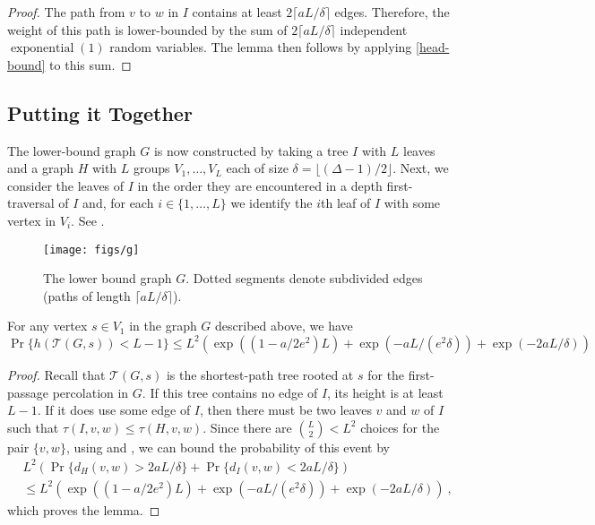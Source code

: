 \documentclass{patmorin}
\DeclareMathOperator{\exponential}{exponential}
\newcommand{\tcal}{\mathcal{T}}
\begin{document}
\begin{proof}
  The path from $v$ to $w$ in $I$ contains at least $2\lceil
  aL/\delta\rceil$ edges.  Therefore, the weight of this path is
  lower-bounded by the sum of $2\lceil aL/\delta\rceil$ independent
  $\exponential(1)$ random variables.  The lemma then follows by applying
  \eqref{head-bound} to this sum.
\end{proof}


\subsection{Putting it Together}

The lower-bound graph $G$ is now constructed by taking a tree $I$ with
$L$ leaves and a graph $H$ with $L$ groups $V_1,\ldots,V_L$ each of size
$\delta=\lfloor(\Delta-1)/2\rfloor$.  Next, we consider the leaves of
$I$ in the order they are encountered in a depth first-traversal of $I$
and, for each $i\in\{1,\ldots,L\}$ we identify the $i$th leaf of $I$
with some vertex in $V_i$.  See .

\begin{figure}
  \begin{center}
    \texttt{[image: figs/g]}
  \end{center}
  \caption{The lower bound graph $G$. Dotted segments denote subdivided edges (paths of length $\lceil aL/\delta\rceil$).}
\end{figure}

\begin{lem}
For any vertex $s\in V_1$ in the graph $G$ described above, we have
\[
\Pr\{h(\tcal(G,s)) < L-1\}
\le L^2\left(\exp((1-a/2e^2)L) 
                + \exp(-aL/(e^2\delta)) 
                + \exp(-2aL/\delta)
              \right)
\]
\end{lem}

\begin{proof}
Recall that $\tcal(G,s)$ is the shortest-path tree rooted at $s$ for the first-passage percolation in $G$.
If this tree contains no edge of $I$,
its height is at least $L-1$.
If it does use some edge of $I$, then there must be two leaves $v$ and $w$ of $I$ such that $\tau(I,v,w)\le \tau(H,v,w)$. Since there are $\binom{L}{2}<L^2$ choices for the pair $\{v,w\}$,
using  and , we can bound the probability of this event by
  \begin{align*}
       & L^2\left(\Pr\{d_H(v,w) > 2aL/\delta\} + \Pr\{d_I(v,w) < 2aL/\delta\}\right)  \\
       & \le L^2\left(\exp((1-a/2e^2)L) 
                + \exp(-aL/(e^2\delta)) 
                + \exp(-2aL/\delta)
              \right)\:,
  \end{align*}
which proves the lemma.
\end{proof}
\end{document}
